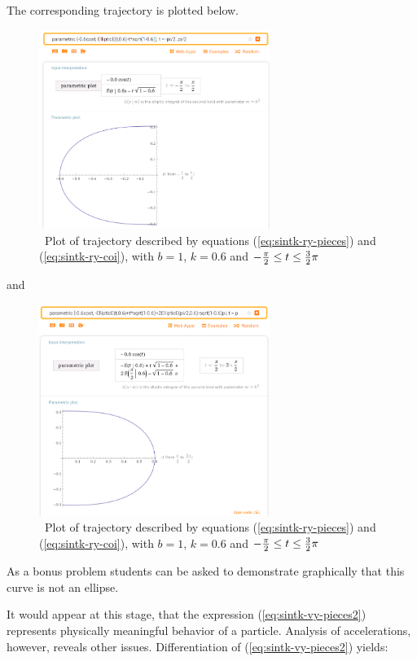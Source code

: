 \documentclass[journal]{IEEEtran}
\begin{document}
The corresponding trajectory is plotted below.

\begin{figure}[H]
\includegraphics[width=7.5cm]{r_y-sintk-b-piece1}
\caption{\ Plot of trajectory described by equations (\ref{eq:sintk-ry-pieces}) and (\ref{eq:sintk-ry-coi}), with $b=1$, $k=0.6$ and $ - { \pi \over 2 }  \leq t \leq { 3 \over 2 } \pi $ \bigskip}
\centering
\label{fig:r_y-sintk-b}
\end{figure}

and

\begin{figure}[H]
\includegraphics[width=7.5cm]{r_y-sintk-b-piece2}
\caption{\ Plot of trajectory described by equations (\ref{eq:sintk-ry-pieces}) and (\ref{eq:sintk-ry-coi}), with $b=1$, $k=0.6$ and $ - { \pi \over 2 }  \leq t \leq { 3 \over 2 } \pi $ \bigskip}
\centering
\label{fig:r_y-sintk-b}
\end{figure}

As a bonus problem students can be asked to demonstrate graphically that this curve is not an ellipse.

It would appear at this stage, that the expression (\ref{eq:sintk-vy-pieces2}) represents physically meaningful behavior of a particle. Analysis of accelerations, however, reveals other issues. Differentiation of (\ref{eq:sintk-vy-pieces2}) yields:
\end{document}
